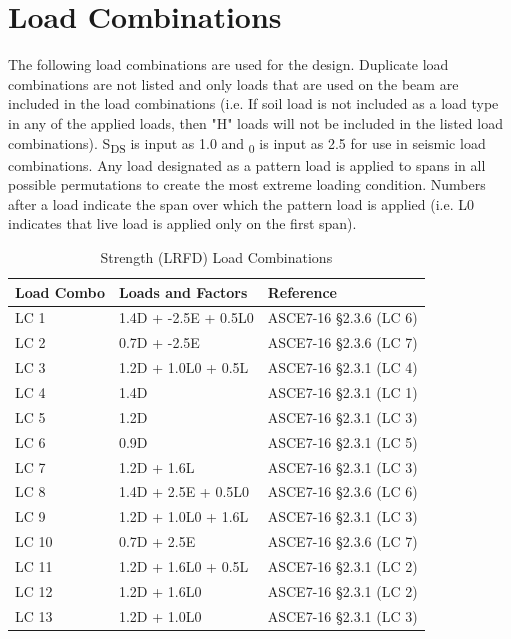 \documentclass[12pt, fleqn]{article}
\begin{document}
\section{Load Combinations}
The following load combinations are used for the design. Duplicate load combinations are not listed and only loads that are used on the beam are included in the load combinations (i.e. If soil load is not included as a load type in any of the applied loads, then "H" loads will not be included in the listed load combinations). S\textsubscript{DS} is input as 1.0 and \textOmega\textsubscript{0} is input as 2.5 for use in seismic load combinations. Any load designated as a pattern load is applied to spans in all possible permutations to create the most extreme loading condition. Numbers after a load indicate the span over which the pattern load is applied (i.e. L0 indicates that live load is applied only on the first span).
\begin{table}[H]
\caption{Strength (LRFD) Load Combinations}
\centering
\begin{tabular}{l l l}
\hline
Load Combo & Loads and Factors & Reference\\
\hline
LC 1 & 1.4D + -2.5E + 0.5L0 & ASCE7-16 \S2.3.6 (LC 6)\\
LC 2 & 0.7D + -2.5E & ASCE7-16 \S2.3.6 (LC 7)\\
LC 3 & 1.2D + 1.0L0 + 0.5L\textsubscriptr0 & ASCE7-16 \S2.3.1 (LC 4)\\
LC 4 & 1.4D & ASCE7-16 \S2.3.1 (LC 1)\\
LC 5 & 1.2D & ASCE7-16 \S2.3.1 (LC 3)\\
LC 6 & 0.9D & ASCE7-16 \S2.3.1 (LC 5)\\
LC 7 & 1.2D + 1.6L\textsubscriptr0 & ASCE7-16 \S2.3.1 (LC 3)\\
LC 8 & 1.4D + 2.5E + 0.5L0 & ASCE7-16 \S2.3.6 (LC 6)\\
LC 9 & 1.2D + 1.0L0 + 1.6L\textsubscriptr0 & ASCE7-16 \S2.3.1 (LC 3)\\
LC 10 & 0.7D + 2.5E & ASCE7-16 \S2.3.6 (LC 7)\\
LC 11 & 1.2D + 1.6L0 + 0.5L\textsubscriptr0 & ASCE7-16 \S2.3.1 (LC 2)\\
LC 12 & 1.2D + 1.6L0 & ASCE7-16 \S2.3.1 (LC 2)\\
LC 13 & 1.2D + 1.0L0 & ASCE7-16 \S2.3.1 (LC 3)\\
\hline
\end{tabular}
\end{table}
\end{document}
